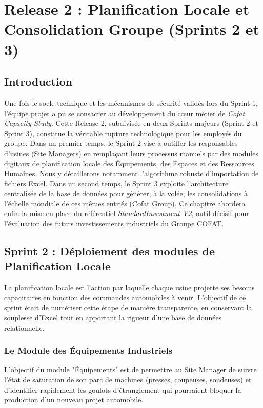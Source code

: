 \chapter{Release 2 : Planification Locale et Consolidation Groupe (Sprints 2 et 3)}
\label{chap:sprints_2_3}

\section{Introduction}
Une fois le socle technique et les mécanismes de sécurité validés lors du Sprint 1, l'équipe projet a pu se consacrer au développement du cœur métier de \textit{Cofat Capacity Study}. Cette Release 2, subdivisée en deux Sprints majeurs (Sprint 2 et Sprint 3), constitue la véritable rupture technologique pour les employés du groupe. Dans un premier temps, le Sprint 2 vise à outiller les responsables d'usines (Site Managers) en remplaçant leurs processus manuels par des modules digitaux de planification locale des Équipements, des Espaces et des Ressources Humaines. Nous y détaillerons notamment l'algorithme robuste d'importation de fichiers Excel. Dans un second temps, le Sprint 3 exploite l'architecture centralisée de la base de données pour générer, à la volée, les consolidations à l'échelle mondiale de ces mêmes entités (Cofat Group). Ce chapitre abordera enfin la mise en place du référentiel \textit{StandardInvestment V2}, outil décisif pour l'évaluation des futurs investissements industriels du Groupe COFAT.

\section{Sprint 2 : Déploiement des modules de Planification Locale}
La planification locale est l'action par laquelle chaque usine projette ses besoins capacitaires en fonction des commandes automobiles à venir. L'objectif de ce sprint était de numériser cette étape de manière transparente, en conservant la souplesse d'Excel tout en apportant la rigueur d'une base de données relationnelle.

\subsection{Le Module des Équipements Industriels}
L'objectif du module "Équipements" est de permettre au Site Manager de suivre l'état de saturation de son parc de machines (presses, coupeuses, soudeuses) et d'identifier rapidement les goulots d'étranglement qui pourraient bloquer la production d'un nouveau projet automobile.


